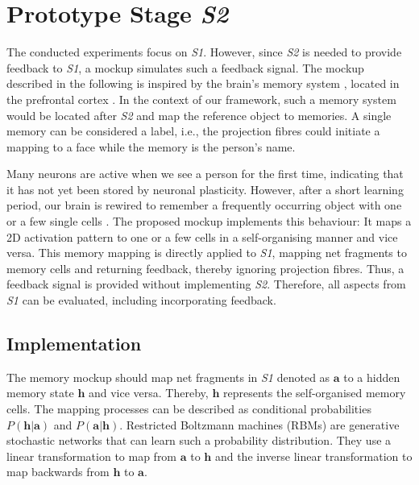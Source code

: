 \section{Prototype Stage \emph{S2}}
The conducted experiments focus on \emph{S1}.
However, since \emph{S2} is needed to provide feedback to \emph{S1}, a mockup simulates such a feedback signal.
The mockup described in the following is inspired by the brain's memory system , located in the prefrontal cortex .
In the context of our framework, such a memory system would be located after \emph{S2} and map the reference object to memories.
A single memory can be considered a label, i.e., the projection fibres could initiate a mapping to a face while the memory is the person's name.

Many neurons are active when we see a person for the first time, indicating that it has not yet been stored by neuronal plasticity.
However, after a short learning period, our brain is rewired to remember a frequently occurring object with one or a few single cells .
The proposed mockup implements this behaviour: It maps a 2D activation pattern to one or a few cells in a self-organising manner and vice versa.
This memory mapping is directly applied to \emph{S1}, mapping net fragments to memory cells and returning feedback, thereby ignoring projection fibres.
Thus, a feedback signal is provided without implementing \emph{S2}.
Therefore, all aspects from \emph{S1} can be evaluated, including incorporating feedback.


\subsection{Implementation}
The memory mockup should map net fragments in \emph{S1} denoted as $\boldsymbol{a}$ to a hidden memory state $\boldsymbol{h}$ and vice versa.
Thereby, $\boldsymbol{h}$ represents the self-organised memory cells.
The mapping processes can be described as conditional probabilities $P(\boldsymbol{h}|\boldsymbol{a})$ and $P(\boldsymbol{a}|\boldsymbol{h})$.
Restricted Boltzmann machines (RBMs)  are generative stochastic networks that can learn such a probability distribution.
They use a linear transformation to map from $\boldsymbol{a}$ to $\boldsymbol{h}$ and the inverse linear transformation to map backwards from $\boldsymbol{h}$ to $\boldsymbol{a}$.

